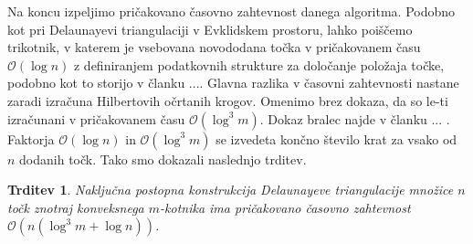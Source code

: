 \documentclass{article}
\newtheorem{trditev}{Trditev}
\begin{document}
Na koncu izpeljimo pričakovano časovno zahtevnost danega algoritma. Podobno kot pri Delaunayevi triangulaciji v Evklidskem prostoru, lahko poiščemo trikotnik, v katerem je vsebovana novododana točka v pričakovanem času $\mathcal{O} (\log n)$ z definiranjem podatkovnih strukture za določanje položaja točke, podobno kot to storijo v članku ....
Glavna razlika v časovni zahtevnosti nastane zaradi izračuna Hilbertovih očrtanih krogov. Omenimo brez dokaza, da so le-ti izračunani v pričakovanem času $\mathcal{O} (\log^3 m)$. Dokaz bralec najde v članku ... .
Faktorja $\mathcal{O} (\log n)$ in $\mathcal{O} (\log^3 m)$ se izvedeta končno število krat za vsako od $n$ dodanih točk. Tako smo dokazali naslednjo trditev.

\begin{trditev}
    Naključna postopna konstrukcija Delaunayeve triangulacije množice $n$ točk znotraj konveksnega $m$-kotnika ima pričakovano časovno zahtevnost $\mathcal{O} (n (\log^3 m + \log n))$.
\end{trditev}
\end{document}
